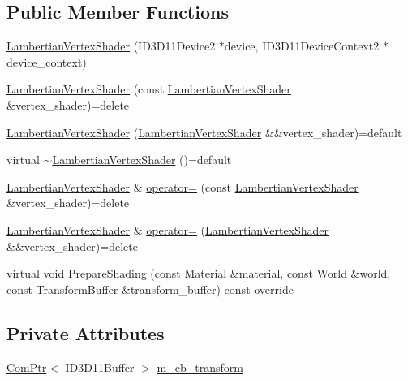 \subsection*{Public Member Functions}
\begin{DoxyCompactItemize}
\item 
\hyperlink{classmage_1_1_lambertian_vertex_shader_a07be678df09024a53b3f5fc323a7f793}{Lambertian\+Vertex\+Shader} (I\+D3\+D11\+Device2 $\ast$device, I\+D3\+D11\+Device\+Context2 $\ast$device\+\_\+context)
\item 
\hyperlink{classmage_1_1_lambertian_vertex_shader_add164d66906e307d95232b2c41567a21}{Lambertian\+Vertex\+Shader} (const \hyperlink{classmage_1_1_lambertian_vertex_shader}{Lambertian\+Vertex\+Shader} \&vertex\+\_\+shader)=delete
\item 
\hyperlink{classmage_1_1_lambertian_vertex_shader_afd8f8b77d0e54df2241fe5f3f54205f4}{Lambertian\+Vertex\+Shader} (\hyperlink{classmage_1_1_lambertian_vertex_shader}{Lambertian\+Vertex\+Shader} \&\&vertex\+\_\+shader)=default
\item 
virtual \hyperlink{classmage_1_1_lambertian_vertex_shader_a55636fd3817b97b6529690d6e3e5cd46}{$\sim$\+Lambertian\+Vertex\+Shader} ()=default
\item 
\hyperlink{classmage_1_1_lambertian_vertex_shader}{Lambertian\+Vertex\+Shader} \& \hyperlink{classmage_1_1_lambertian_vertex_shader_a974b43346ab5d8081d9101f715e7670d}{operator=} (const \hyperlink{classmage_1_1_lambertian_vertex_shader}{Lambertian\+Vertex\+Shader} \&vertex\+\_\+shader)=delete
\item 
\hyperlink{classmage_1_1_lambertian_vertex_shader}{Lambertian\+Vertex\+Shader} \& \hyperlink{classmage_1_1_lambertian_vertex_shader_ae0a53e712856923403c1f7542941df6e}{operator=} (\hyperlink{classmage_1_1_lambertian_vertex_shader}{Lambertian\+Vertex\+Shader} \&\&vertex\+\_\+shader)=delete
\item 
virtual void \hyperlink{classmage_1_1_lambertian_vertex_shader_a62e3902fb931cddefd94e117e20d190b}{Prepare\+Shading} (const \hyperlink{structmage_1_1_material}{Material} \&material, const \hyperlink{classmage_1_1_world}{World} \&world, const Transform\+Buffer \&transform\+\_\+buffer) const override
\end{DoxyCompactItemize}
\subsection*{Private Attributes}
\begin{DoxyCompactItemize}
\item 
\hyperlink{namespacemage_ae74f374780900893caa5555d1031fd79}{Com\+Ptr}$<$ I\+D3\+D11\+Buffer $>$ \hyperlink{classmage_1_1_lambertian_vertex_shader_aae0f2411821315d89eeb982e6c30c22e}{m\+\_\+cb\+\_\+transform}
\end{DoxyCompactItemize}
